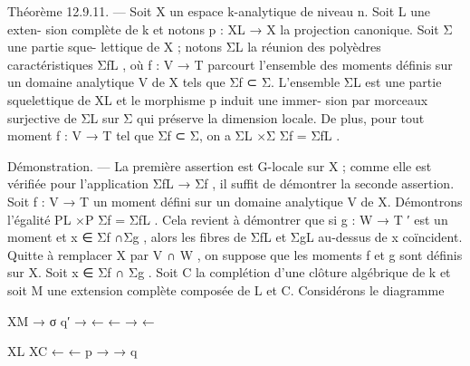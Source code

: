 \documentclass[
  10pt,
]{article}
\newenvironment{Shaded}{}{}
\newcommand{\NormalTok}[1]{#1}
\begin{document}
\begin{Shaded}
\begin{Highlighting}[]
\NormalTok{Théorème 12.9.11. — Soit X un espace k{-}analytique de niveau n. Soit L une exten{-}}
\NormalTok{sion complète de k et notons p : XL → X la projection canonique. Soit Σ une partie sque{-}}
\NormalTok{lettique de X ; notons ΣL la réunion des polyèdres caractéristiques ΣfL , où f : V → T}
\NormalTok{parcourt l’ensemble des moments définis sur un domaine analytique V de X tels que}
\NormalTok{Σf ⊂ Σ.}
\NormalTok{   L’ensemble ΣL est une partie squelettique de XL et le morphisme p induit une immer{-}}
\NormalTok{sion par morceaux surjective de ΣL sur Σ qui préserve la dimension locale.}
\NormalTok{   De plus, pour tout moment f : V → T tel que Σf ⊂ Σ, on a ΣL ×Σ Σf = ΣfL .}

\NormalTok{Démonstration. — La première assertion est G{-}locale sur X ; comme elle est vérifiée}
\NormalTok{pour l’application ΣfL → Σf , il suffit de démontrer la seconde assertion.}
\NormalTok{   Soit f : V → T un moment défini sur un domaine analytique V de X. Démontrons}
\NormalTok{l’égalité PL ×P Σf = ΣfL . Cela revient à démontrer que si g : W → T ′ est un moment et}
\NormalTok{x ∈ Σf ∩Σg , alors les fibres de ΣfL et ΣgL au{-}dessus de x coïncident. Quitte à remplacer X}
\NormalTok{par V ∩ W , on suppose que les moments f et g sont définis sur X.}
\NormalTok{   Soit x ∈ Σf ∩ Σg . Soit C la complétion d’une clôture algébrique de k et soit M une}
\NormalTok{extension complète composée de L et C. Considérons le diagramme}

\NormalTok{                                               XM   →}
\NormalTok{                                                           σ}
\NormalTok{                                         q′}
\NormalTok{                                         →    ←      ←}
\NormalTok{                                                       →}
\NormalTok{                                                           ←}

\NormalTok{                                    XL                  XC}
\NormalTok{                                         ←             ←}
\NormalTok{                                         p →}
\NormalTok{                                                   →   q}


\end{Highlighting}
\end{Shaded}
\end{document}
